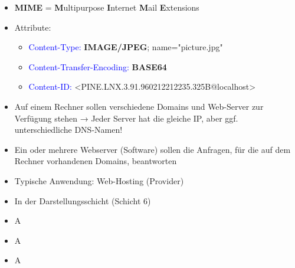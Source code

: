 \begin{itemize}
    \item \textbf{MIME} = \textbf{M}ultipurpose \textbf{I}nternet \textbf{M}ail \textbf{E}xtensions
    \item Attribute:
    \begin{itemize}
        \item \textcolor{blue}{Content-Type:} \textbf{IMAGE/JPEG}; name="picture.jpg"
        \item \textcolor{blue}{Content-Transfer-Encoding:} \textbf{BASE64}
        \item \textcolor{blue}{Content-ID:} <PINE.LNX.3.91.960212212235.325B@localhost>
    \end{itemize}
\end{itemize}

\begin{itemize}
    \item Auf einem Rechner sollen verschiedene Domains und Web-Server zur Verfügung stehen → Jeder Server hat die gleiche IP, aber ggf. unterschiedliche DNS-Namen!
    \item Ein oder mehrere Webserver (Software) sollen die Anfragen, für die auf dem Rechner vorhandenen Domains, beantworten
    \item Typische Anwendung: Web-Hosting (Provider)
\end{itemize}

\begin{itemize}
    \item In der Darstellungsschicht (Schicht 6)
\end{itemize}

\begin{itemize}
    \item \todo A
\end{itemize}

\begin{itemize}
    \item \todo A
\end{itemize}

\begin{itemize}
    \item \todo A
\end{itemize}

